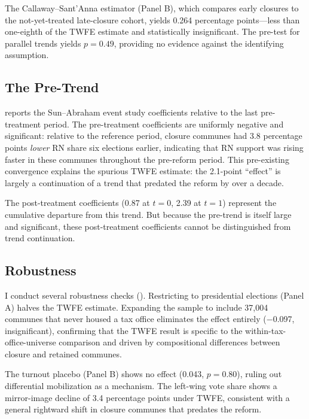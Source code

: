 \documentclass[12pt]{article}
\begin{document}
The Callaway--Sant'Anna estimator (Panel B), which compares early closures to the not-yet-treated late-closure cohort, yields 0.264 percentage points---less than one-eighth of the TWFE estimate and statistically insignificant. The pre-test for parallel trends yields $p=0.49$, providing no evidence against the identifying assumption.

\subsection{The Pre-Trend}



 reports the Sun--Abraham event study coefficients relative to the last pre-treatment period. The pre-treatment coefficients are uniformly negative and significant: relative to the reference period, closure communes had 3.8 percentage points \textit{lower} RN share six elections earlier, indicating that RN support was rising faster in these communes throughout the pre-reform period. This pre-existing convergence explains the spurious TWFE estimate: the 2.1-point ``effect'' is largely a continuation of a trend that predated the reform by over a decade.

The post-treatment coefficients (0.87 at $t=0$, 2.39 at $t=1$) represent the cumulative departure from this trend. But because the pre-trend is itself large and significant, these post-treatment coefficients cannot be distinguished from trend continuation.

\subsection{Robustness}



I conduct several robustness checks (). Restricting to presidential elections (Panel A) halves the TWFE estimate. Expanding the sample to include 37,004 communes that never housed a tax office eliminates the effect entirely ($-$0.097, insignificant), confirming that the TWFE result is specific to the within-tax-office-universe comparison and driven by compositional differences between closure and retained communes.

The turnout placebo (Panel B) shows no effect (0.043, $p=0.80$), ruling out differential mobilization as a mechanism. The left-wing vote share shows a mirror-image decline of 3.4 percentage points under TWFE, consistent with a general rightward shift in closure communes that predates the reform.
\end{document}
